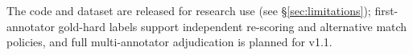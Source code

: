\documentclass{article}
\newcommand{\NR}{\texttt{NOT\_REPORTED}}
\begin{document}
The code and dataset are released for research use (see \S\ref{sec:limitations}); first-annotator gold-hard labels support independent re-scoring and alternative match policies, and full multi-annotator adjudication is planned for v1.1.




\end{document}
